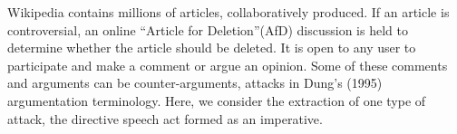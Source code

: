 Wikipedia contains millions of articles, collaboratively produced. If an article is controversial, an online ``Article for Deletion''(AfD) discussion is held to determine whether the article should be deleted. It is open to any user to participate and make a comment or argue an opinion. Some of these comments and arguments can be counter-arguments, attacks in Dung's (1995) argumentation terminology. Here, we consider the extraction of one type of attack, the directive speech act formed as an imperative.
